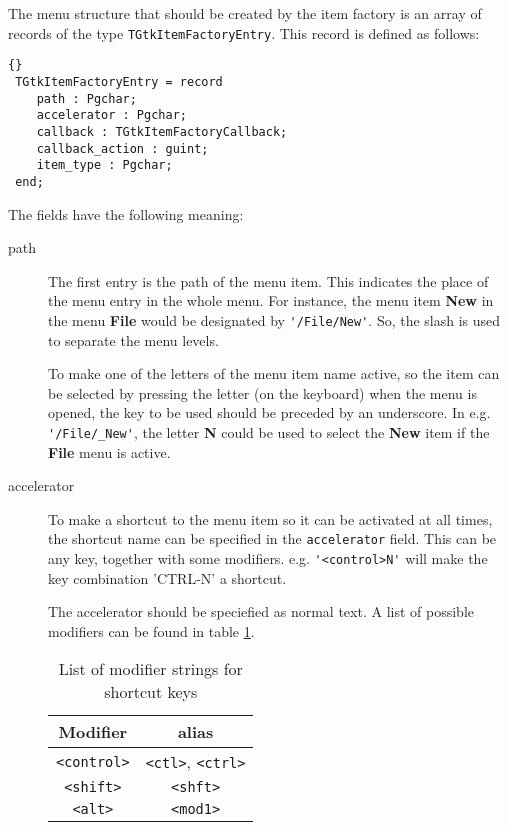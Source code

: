 \documentclass[10pt]{article}
\begin{document}
The menu structure that should be created by the item factory is an 
array of records of the type  \lstinline|TGtkItemFactoryEntry|. 
This record is defined as follows:
\begin{lstlisting}{}
 TGtkItemFactoryEntry = record
    path : Pgchar;
    accelerator : Pgchar;
    callback : TGtkItemFactoryCallback;
    callback_action : guint;
    item_type : Pgchar;
 end;
\end{lstlisting}
The fields have the following meaning:
\begin{description}
\item[path]
The first entry is the path of the menu item. This indicates the place of
the menu entry in the whole menu. For instance, the menu item \textbf{New}
in the menu \textbf{File} would be designated by \lstinline|'/File/New'|.
So, the slash is used to separate the menu levels. 

To make one of the letters of the menu item name active, so the item can be
selected by pressing the letter (on the keyboard) when the menu is opened, 
the key to be used should be preceded by an underscore. 
In e.g. \lstinline|'/File/_New'|, the letter \textbf{N} could be used to 
select the  \textbf{New} item if the \textbf{File} menu is active.

\item[accelerator] To make a shortcut to the menu item so it can be 
activated at all times, the shortcut name can be specified in the 
\lstinline|accelerator| field. This can be any key, together with some 
modifiers. e.g. \lstinline|'<control>N'| will make the key combination 
'CTRL-N' a shortcut.

The accelerator should be speciefied as normal text.  A list of possible
modifiers can be found in table \ref{tab:modifiers}.
\begin{table}[ht]
\begin{center}
\caption{List of modifier strings for shortcut keys}\label{tab:modifiers}
\begin{tabular}{cc}
Modifier & alias \\ \hline
\lstinline|<control>| & \lstinline|<ctl>|, \lstinline|<ctrl>| \\
\lstinline|<shift>| & \lstinline|<shft>| \\
\lstinline|<alt>| & \lstinline|<mod1>| \\ \hline
\end{tabular}
\end{center}
\end{table}


\end{description}
\end{document}
